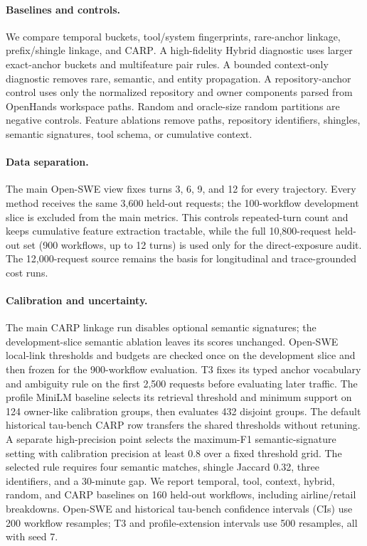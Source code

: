 \documentclass[letterpaper]{article}
\newcommand{\carp}{\textsc{CARP}\xspace}
\begin{document}
\paragraph{Baselines and controls.}
We compare temporal buckets, tool/system fingerprints, rare-anchor linkage, prefix/shingle
linkage, and \carp. A high-fidelity Hybrid diagnostic uses larger exact-anchor buckets and
multifeature pair rules. A bounded context-only diagnostic removes rare, semantic, and entity
propagation. A repository-anchor control uses only the normalized
repository and owner components parsed from OpenHands workspace paths. Random and oracle-size
random partitions are negative controls. Feature
ablations remove paths, repository identifiers, shingles, semantic signatures, tool schema, or
cumulative context.

\paragraph{Data separation.}
The main Open-SWE view fixes turns 3, 6, 9, and 12 for every trajectory. Every method receives the
same 3,600 held-out requests; the 100-workflow development slice is excluded from the main metrics.
This controls repeated-turn count and keeps cumulative feature extraction tractable, while the
full 10,800-request held-out set (900 workflows, up to 12 turns) is used only for the direct-exposure
audit. The 12,000-request source remains the basis for longitudinal and trace-grounded cost runs.

\paragraph{Calibration and uncertainty.}
The main \carp linkage run disables optional semantic signatures; the development-slice semantic
ablation leaves its scores unchanged. Open-SWE local-link thresholds and budgets are checked once
on the development slice and then frozen for the 900-workflow evaluation. T3 fixes its typed anchor
vocabulary and ambiguity rule on the first 2,500 requests before evaluating later traffic. The
profile MiniLM baseline selects its retrieval threshold and minimum support on 124 owner-like
calibration groups, then evaluates 432
disjoint groups. The default historical tau-bench \carp row transfers the shared thresholds without
retuning. A separate high-precision point selects the maximum-F1 semantic-signature setting with
calibration precision at least 0.8 over a fixed threshold grid. The selected rule requires four
semantic matches, shingle Jaccard 0.32, three identifiers, and a 30-minute gap. We report temporal,
tool, context, hybrid, random, and \carp baselines on 160 held-out workflows, including
airline/retail breakdowns. Open-SWE and historical tau-bench confidence intervals (CIs) use 200
workflow resamples; T3 and profile-extension intervals use 500
resamples, all with seed 7.
\end{document}
